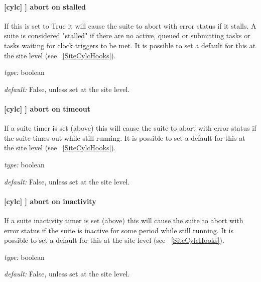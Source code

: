 \paragraph[abort on stalled]{[cylc] \textrightarrow [[events]] \textrightarrow abort on stalled}

If this is set to True it will cause the suite to abort with error status
if it stalls. A suite is considered "stalled" if there are no active,
queued or submitting tasks or tasks waiting for clock triggers to be met. It is
possible to set a default for this at the site level
(see ~\ref{SiteCylcHooks}).

\begin{myitemize}
    \item {\em type:} boolean
    \item {\em default:} False, unless set at the site level.
\end{myitemize}

\paragraph[abort on timeout]{[cylc] \textrightarrow [[events]] \textrightarrow abort on timeout}

If a suite timer is set (above) this will cause the suite to abort with
error status if the suite times out while still running. It is possible to set
a default for this at the site level (see ~\ref{SiteCylcHooks}).

\begin{myitemize}
    \item {\em type:} boolean
    \item {\em default:} False, unless set at the site level.
\end{myitemize}

\paragraph[abort on inactivity]{[cylc] \textrightarrow [[events]] \textrightarrow abort on inactivity}

If a suite inactivity timer is set (above) this will cause the suite to abort
with error status if the suite is inactive for some period while still running.
It is possible to set a default for this at the site level
(see ~\ref{SiteCylcHooks}).

\begin{myitemize}
    \item {\em type:} boolean
    \item {\em default:} False, unless set at the site level.
\end{myitemize}

